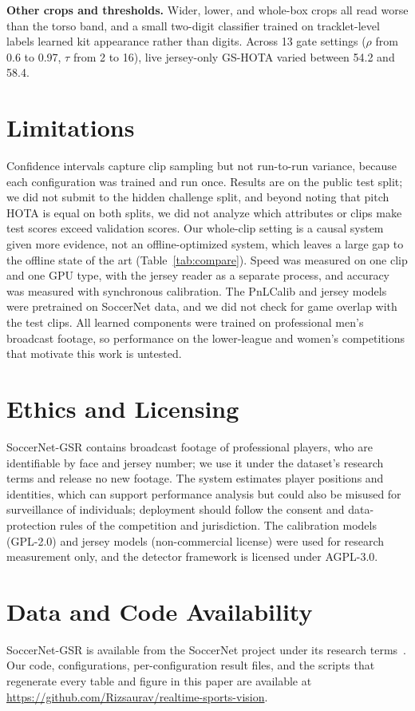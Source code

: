 \documentclass[conference]{IEEEtran}
\begin{document}
\textbf{Other crops and thresholds.} Wider, lower, and whole-box crops all read worse than the torso band, and a small two-digit classifier trained on tracklet-level labels learned kit appearance rather than digits. Across 13 gate settings ($\rho$ from 0.6 to 0.97, $\tau$ from 2 to 16), live jersey-only GS-HOTA varied between 54.2 and 58.4.

\section{Limitations}
Confidence intervals capture clip sampling but not run-to-run variance, because each configuration was trained and run once. Results are on the public test split; we did not submit to the hidden challenge split, and beyond noting that pitch HOTA is equal on both splits, we did not analyze which attributes or clips make test scores exceed validation scores. Our whole-clip setting is a causal system given more evidence, not an offline-optimized system, which leaves a large gap to the offline state of the art (Table~\ref{tab:compare}). Speed was measured on one clip and one GPU type, with the jersey reader as a separate process, and accuracy was measured with synchronous calibration. The PnLCalib and jersey models were pretrained on SoccerNet data, and we did not check for game overlap with the test clips. All learned components were trained on professional men's broadcast footage, so performance on the lower-league and women's competitions that motivate this work is untested.

\section{Ethics and Licensing}
SoccerNet-GSR contains broadcast footage of professional players, who are identifiable by face and jersey number; we use it under the dataset's research terms and release no new footage. The system estimates player positions and identities, which can support performance analysis but could also be misused for surveillance of individuals; deployment should follow the consent and data-protection rules of the competition and jurisdiction. The calibration models (GPL-2.0) and jersey models (non-commercial license) were used for research measurement only, and the detector framework is licensed under AGPL-3.0.

\section{Data and Code Availability}
SoccerNet-GSR is available from the SoccerNet project under its research terms~\cite{somers2024gsr}. Our code, configurations, per-configuration result files, and the scripts that regenerate every table and figure in this paper are available at \url{https://github.com/Rizsaurav/realtime-sports-vision}.
\end{document}
